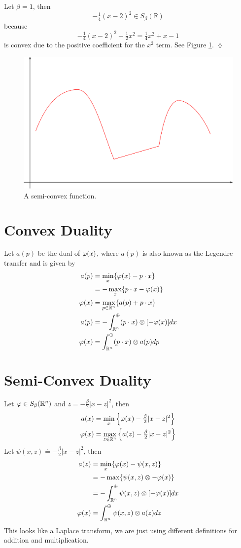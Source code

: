 \begin{example}
Let $\beta=1$, then
$$-\tfrac{1}{4}(x-2)^2\in S_\beta(\mathbb{R})$$
because
$$-\tfrac{1}{4}(x-2)^2 + \tfrac{1}{2}x^2 = \tfrac{1}{4}x^2 + x - 1$$
is convex due to the positive coefficient for the $x^2$ term. See Figure \ref{fig:18semiconvex}.
$\lozenge$
\end{example}

\begin{figure}[ht!]
	\centering
	\includegraphics[width=.4\textwidth]{images/18semiconvex}
	\caption{A semi-convex function.}
	\label{fig:18semiconvex}
\end{figure}

\section{Convex Duality}
Let $a(p)$ be the dual of $\varphi(x)$, where $a(p)$ is also known as the Legendre transfer and is given by
\begin{align*}
a(p) &= \min_x\{\varphi(x)-p\cdot x\} \\
&= -\max_x\{p\cdot x-\varphi(x)\} \\
\varphi(x) &= \max_{p\in\mathbb{R}^n}\{a(p)+p\cdot x\} \\
a(p) &= -\int_{\mathbb{R}^n}^\oplus (p\cdot x)\otimes[-\varphi(x)]dx \\
\varphi(x) &= \int_{\mathbb{R}^n}^\oplus (p\cdot x)\otimes a(p)dp
\end{align*}

\section{Semi-Convex Duality}
Let $\varphi\in S_\beta(\mathbb{R}^n)$ and $z=-\frac{\beta}{2}|x-z|^2$, then
\begin{align*}
a(x) &= \min_x\left\lbrace \varphi(x) - \tfrac{\beta}{2}|x-z|^2 \right\rbrace \\
\varphi(x) &= \max_{z\in\mathbb{R}^n}\left\lbrace a(z) - \tfrac{\beta}{2}|x-z|^2 \right\rbrace
\end{align*}
Let $\psi(x,z)\doteq -\tfrac{\beta}{2}|x-z|^2$, then
\begin{align*}
a(z) &= \min_x\{\varphi(x)-\psi(x,z)\} \\
&= -\max\{\psi(x,z)\otimes-\varphi(x)\} \\
&= -\int_{\mathbb{R}^n}^\oplus \psi(x,z)\otimes[-\varphi(x)]dx \\
\varphi(x) &= \int_{\mathbb{R}^n}^\oplus \psi(x,z)\otimes a(z)dz
\end{align*}
This looks like a Laplace transform, we are just using different definitions for addition and multiplication.

